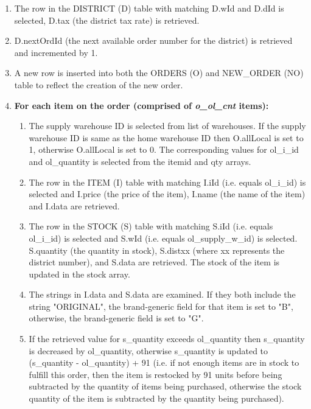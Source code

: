\begin{enumerate}
    \item The row in the DISTRICT (D) table with matching D.wId and D.dId is selected, D.tax (the district tax rate) is retrieved.
    
    \item D.nextOrdId (the next available order number for the district) is retrieved and incremented by 1.
    
    \item A new row is inserted into both the ORDERS (O) and NEW\_ORDER (NO) table to reflect the creation of the new order.
    
    \item \textbf{For each item on the order (comprised of \textit{o\_ol\_cnt} items): }
    
    \begin{enumerate}
        \item The supply warehouse ID is selected from list of warehouses. If the supply warehouse ID is same as the home warehouse ID then O.allLocal is set to 1, otherwise O.allLocal is set to 0. The corresponding  values for ol\_i\_id and ol\_quantity is selected from the itemid and qty arrays.
        
        \item The row in the ITEM (I) table with matching I.iId (i.e. equals ol\_i\_id) is selected and I.price (the price of the item), I.name (the name of the item) and I.data are retrieved.
        
        \item The row in the STOCK (S) table with matching S.iId (i.e. equals ol\_i\_id) is selected and S.wId (i.e. equals ol\_supply\_w\_id) is selected. S.quantity (the quantity in stock), S.distxx (where xx represents the district number), and S.data are retrieved. The stock of the item is updated in the stock array.
        
        \item The strings in I.data and S.data are examined. If they both include the string "ORIGINAL", the brand-generic field for that item is set to "B", otherwise, the brand-generic field is set to "G".
        
        \item If the retrieved value for s\_quantity exceeds ol\_quantity then s\_quantity is decreased by ol\_quantity, otherwise s\_quantity is updated to (s\_quantity - ol\_quantity) + 91 (i.e. if not enough items are in stock to fulfill this order, then the item is restocked by 91 units before being subtracted by the quantity of items being purchased, otherwise the stock quantity of the item is subtracted by the quantity being purchased).
        

\end{enumerate}
\end{enumerate}
